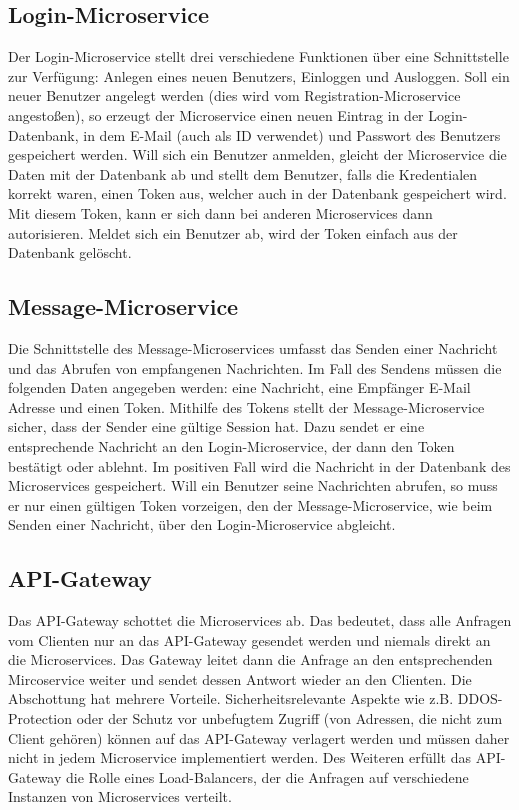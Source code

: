 \subsection{Login-Microservice}
Der Login-Microservice stellt drei verschiedene Funktionen über eine Schnittstelle zur Verfügung: Anlegen eines neuen Benutzers, Einloggen und Ausloggen. Soll ein neuer Benutzer angelegt werden (dies wird vom Registration-Microservice angestoßen), so erzeugt der Microservice einen neuen Eintrag in der Login-Datenbank, in dem E-Mail (auch als ID verwendet) und Passwort des Benutzers gespeichert werden. Will sich ein Benutzer anmelden, gleicht der Microservice die Daten mit der Datenbank ab und stellt dem Benutzer, falls die Kredentialen korrekt waren, einen Token aus, welcher auch in der Datenbank gespeichert wird. Mit diesem Token, kann er sich dann bei anderen Microservices dann autorisieren. Meldet sich ein Benutzer ab, wird der Token einfach aus der Datenbank gelöscht.

\subsection{Message-Microservice}
Die Schnittstelle des Message-Microservices umfasst das Senden einer Nachricht und das Abrufen von empfangenen Nachrichten. Im Fall des Sendens müssen die folgenden Daten angegeben werden: eine Nachricht, eine Empfänger E-Mail Adresse und einen Token. Mithilfe des Tokens stellt der Message-Microservice sicher, dass der Sender eine gültige Session hat. Dazu sendet er eine entsprechende Nachricht an den Login-Microservice, der dann den Token bestätigt oder ablehnt. Im positiven Fall wird die Nachricht in der Datenbank des Microservices gespeichert. Will ein Benutzer seine Nachrichten abrufen, so muss er nur einen gültigen Token vorzeigen, den der Message-Microservice, wie beim Senden einer Nachricht, über den Login-Microservice abgleicht.

\subsection{API-Gateway}
Das API-Gateway schottet die Microservices ab. Das bedeutet, dass alle Anfragen vom Clienten nur an das API-Gateway gesendet werden und niemals direkt an die Microservices. Das Gateway leitet dann die Anfrage an den entsprechenden Mircoservice weiter und sendet dessen Antwort wieder an den Clienten. Die Abschottung hat mehrere Vorteile. Sicherheitsrelevante Aspekte wie z.B. DDOS-Protection oder der Schutz vor unbefugtem Zugriff (von Adressen, die nicht zum Client gehören) können auf das API-Gateway verlagert werden und müssen daher nicht in jedem Microservice implementiert werden.
Des Weiteren erfüllt das API-Gateway die Rolle eines Load-Balancers, der die Anfragen auf verschiedene Instanzen von Microservices verteilt. 

